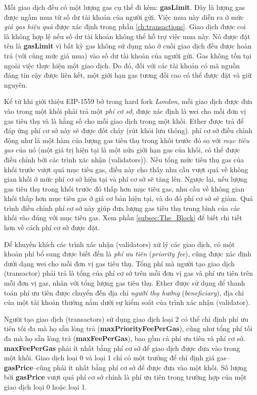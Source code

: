 \documentclass[9pt,oneside]{amsart}
\begin{document}
\begin{multicols}{2}
Mỗi giao dịch đều có một lượng gas cụ thể đi kèm: \textbf{gasLimit}. Đây là lượng gas được ngầm mua từ số dư tài khoản của người gửi. Việc mua này diễn ra ở mức \textit{giá gas hiệu quả} được xác định trong phần \ref{ch:transactions}. Giao dịch được coi là không hợp lệ nếu số dư tài khoản không thể hỗ trợ việc mua này. Nó được đặt tên là \textbf{gasLimit} vì bất kỳ gas không sử dụng nào ở cuối giao dịch đều được hoàn trả (với cùng mức giá mua) vào số dư tài khoản của người gửi. Gas không tồn tại ngoài việc thực hiện một giao dịch. Do đó, đối với các tài khoản có mã nguồn đáng tin cậy được liên kết, một giới hạn gas tương đối cao có thể được đặt và giữ nguyên.

Kể từ khi giới thiệu EIP-1559 bở \cite{EIP-1559} trong hard fork \textit{London}, mỗi giao dịch được đưa vào trong một khối phải trả một \textit{phí cơ sở}, được xác định là wei cho mỗi đơn vị gas tiêu thụ và là hằng số cho mỗi giao dịch trong một khối. Ether được trả để đáp ứng phí cơ sở này sẽ được đốt cháy (rút khỏi lưu thông). phí cơ sở điều chỉnh động như là một hàm của lượng gas tiêu thụ trong khối trước đó so với \textit{mục tiêu gas} của nó (một giá trị hiện tại là một nửa giới hạn gas của khối, có thể được điều chỉnh bởi các trình xác nhận (validators)). Nếu tổng mức tiêu thụ gas của khối trước vượt quá mục tiêu gas, điều này cho thấy nhu cầu vượt quá về không gian khối ở mức phí cơ sở hiện tại và phí cơ sở sẽ tăng lên. Ngược lại, nếu lượng gas tiêu thụ trong khối trước đó thấp hơn mục tiêu gas, nhu cầu về không gian khối thấp hơn mục tiêu gas ở giá cơ bản hiện tại, và do đó phí cơ sở sẽ giảm. Quá trình điều chỉnh phí cơ sở này giúp đưa lượng gas tiêu thụ trung bình của các khối vào đúng với mục tiêu gas. Xem phần \ref{subsec:The_Block} để biết chi tiết hơn về cách phí cơ sở được đặt.

Để khuyến khích các trình xác nhận (validators) xử lý các giao dịch, có một khoản phí bổ sung được biết đến là \textit{phí ưu tiên} (\textit{priority fee}), cũng được xác định dưới dạng wei cho mỗi đơn vị gas tiêu thụ. Tổng phí mà người tạo giao dịch (transactor) phải trả là tổng của phí cơ sở trên mỗi đơn vị gas và phí ưu tiên trên mỗi đơn vị gas, nhân với tổng lượng gas tiêu thụ. Ether được sử dụng để thanh toán phí ưu tiên được chuyển đến địa chỉ \textit{người thụ hưởng} (\textit{beneficiary}), địa chỉ của một tài khoản thường nằm dưới sự kiểm soát của trình xác nhận (validator).

Người tạo giao dịch (transactors) sử dụng giao dịch loại 2 có thể chỉ định phí ưu tiên tối đa mà họ sẵn lòng trả (\textbf{maxPriorityFeePerGas}), cũng như tổng phí tối đa mà họ sẵn lòng trả (\textbf{maxFeePerGas}), bao gồm cả phí ưu tiên và phí cơ sở. \textbf{maxFeePerGas} phải ít nhất bằng phí cơ sở để giao dịch được đưa vào trong một khối. Giao dịch loại 0 và loại 1 chỉ có một trường để chỉ định giá gas--\textbf{gasPrice}--cũng phải ít nhất bằng phí cơ sở để được đưa vào một khối. Số lượng bởi \textbf{gasPrice} vượt quá phí cơ sở chính là phí ưu tiên trong trường hợp của một giao dịch loại 0 hoặc loại 1.


\end{multicols}
\end{document}
